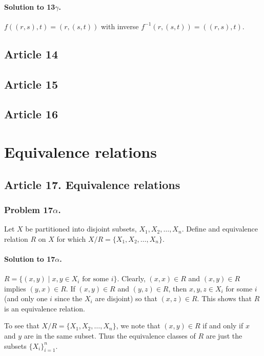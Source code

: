 \paragraph*{Solution to 13$\gamma$.}
$f( (r,s), t) = (r, (s, t))$ with inverse $f^{-1}(r, (s,t)) = ((r,s), t)$.

\subsection{Article 14}

\subsection{Article 15}

\subsection{Article 16}


\section{Equivalence relations}


\subsection{Article 17. Equivalence relations}
\subsubsection{Problem 17$\alpha$.}
Let $X$ be partitioned into disjoint subsets, $X_1, X_2, \dots , X_n$. Define
and equivalence relation $R$ on $X$ for which $X/R = \{X_1, X_2, \dots , X_n \}$.

\paragraph*{Solution to 17$\alpha$.}
$R = \{ (x,y) \mid x, y \in X_i \mbox{ for some } i \}$. Clearly, $(x,x) \in R$ and
$(x,y) \in R$ implies $(y,x) \in R$. If $(x,y) \in R$ and $(y,z) \in R$, then
$x,y,z \in X_i$ for some $i$ (and only one $i$ since the $X_i$ are disjoint) so that
$(x,z) \in R$. This shows that $R$ is an equivalence relation.

To see that $X/R = \{X_1, X_2, \dots , X_n\}$, we note that $(x,y) \in R$ if and
only if $x$ and $y$ are in the same subset. Thus the equivalence classes of $R$
are just the subsets $\{X_i\}_{i=1}^{n}$.

